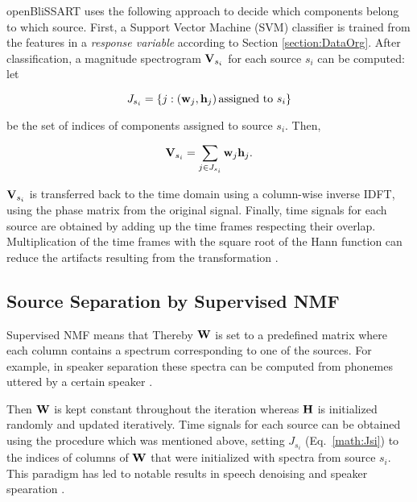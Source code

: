 openBliSSART uses the following approach to decide which components belong to which source. First, a Support Vector Machine (SVM) classifier is trained from the features in a {\em response variable} according to Section \ref{section:DataOrg}. After classification, a magnitude
spectrogram $\mathbf{V}_{s_i}$ for each source $s_i$ can be computed: let

\begin{equation}
    \label{math:Jsi}
    J_{s_i} = \left\{ j: \left(\mathbf{w}_j, \mathbf{h}_j\right) 
                         \mbox{assigned to } s_i \right\}
\end{equation}

\noindent be the set of indices of components assigned to source $s_i$. Then,

\begin{equation}
    \label{math:Vharm}
    \mathbf{V}_{s_i} = \sum\limits_{j \in J_{s_i}} \mathbf{w}_j \mathbf{h}_j .
\end{equation}

$\mathbf{V}_{s_i}$ is transferred back to the time domain using a column-wise
inverse IDFT, using the phase matrix from the original signal. Finally, time
signals for each source are obtained by adding up the time frames respecting
their overlap. Multiplication of the time frames with the square root of the Hann function can
reduce the artifacts resulting from the transformation \cite{Virtanen2005}.


\subsection{Source Separation by Supervised NMF}

\label{sec:nmfsss}

Supervised NMF means that Thereby $\mathbf{W}$ is
set to a predefined matrix where each column contains a spectrum corresponding
to one of the sources. For example, in speaker separation these spectra can be
computed from phonemes uttered by a certain speaker \cite{Schmidt2006}. 

Then $\mathbf{W}$ is kept constant throughout
the iteration whereas $\mathbf{H}$ is initialized randomly and updated
iteratively. Time
signals for each source can be obtained using the procedure which was mentioned
above, setting $J_{s_i}$ (Eq.~\ref{math:Jsi}) to the indices of columns of
$\mathbf{W}$ that were initialized with spectra from source $s_i$. This paradigm
has led to notable results in speech denoising \cite{Wilson2008_1,Wilson2008_2}
and speaker spearation \cite{Schmidt2006,Grady2007}. 


